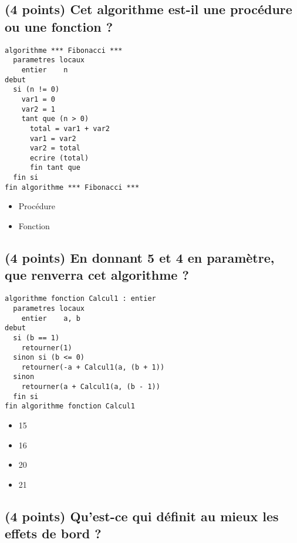 \documentclass[11pt,a4paper]{article}
\begin{document}
\bigskip


\subsection{(4 points) Cet algorithme est-il une procédure ou une fonction ? }

\begin{lstlisting}[style=algorithmique]
algorithme *** Fibonacci ***
  parametres locaux
    entier    n
debut
  si (n != 0)
    var1 = 0
    var2 = 1
    tant que (n > 0)
      total = var1 + var2
      var1 = var2
      var2 = total
      ecrire (total)
      fin tant que
  fin si
fin algorithme *** Fibonacci ***
\end{lstlisting}

\begin{itemize}
  \item[\checkmark] Procédure \\ %
  \item[\CaseCoche] Fonction \\
\end{itemize}


\bigskip


\subsection{(4 points) En donnant 5 et 4 en paramètre, que renverra cet algorithme ? }

\begin{lstlisting}[style=algorithmique]
algorithme fonction Calcul1 : entier
  parametres locaux
    entier    a, b
debut
  si (b == 1)
    retourner(1)
  sinon si (b <= 0)
    retourner(-a + Calcul1(a, (b + 1))
  sinon
    retourner(a + Calcul1(a, (b - 1))
  fin si
fin algorithme fonction Calcul1
\end{lstlisting}


\begin{itemize}
  \item[\CaseCoche] 15 \\
  \item[\checkmark] 16 \\ %
  \item[\CaseCoche] 20 \\
  \item[\CaseCoche] 21 \\
\end{itemize}


\bigskip


\subsection{(4 points) Qu'est-ce qui définit au mieux les effets de bord ? }
\end{document}
